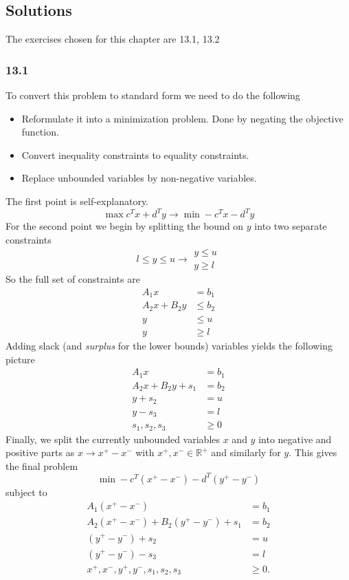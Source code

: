 \subsection{Solutions}
The exercises chosen for this chapter are 13.1, 13.2
\subsubsection{13.1}
To convert this problem to standard form we need to do the following
\begin{itemize}
    \item Reformulate it into a minimization problem. Done by negating the objective function.
    \item Convert inequality constraints to equality constraints.
    \item Replace unbounded variables by non-negative variables.
\end{itemize}
The first point is self-explanatory.
\[
    \operatorname{max} c^T x + d^T y \to \operatorname{min} -c^T x - d^T y
\]
For the second point we begin by splitting the bound on $y$ into two separate constraints
\[
    l \leq y \leq u \to \begin{array}{l}
        y \leq u \\
        y \geq l
    \end{array}
\]
So the full set of constraints are
\begin{align*}
    A_1 x         & = b_1    \\
    A_2 x + B_2 y & \leq b_2 \\
    y             & \leq u   \\
    y             & \geq l
\end{align*}
Adding slack (and \textit{surplus} for the lower bounds) variables yields the following picture
\begin{align*}
    A_1 x               & = b_1  \\
    A_2 x + B_2 y + s_1 & = b_2  \\
    y + s_2             & = u    \\
    y - s_3             & = l    \\
    s_1, s_2, s_3       & \geq 0
\end{align*}
Finally, we split the currently unbounded variables $x$ and $y$ into negative and positive parts as $x \to x^+ - x^-$ with $x^+, x^-\in \mathbb{R}^+$ and similarly for $y$.
This gives the final problem
\[
    \operatorname{min} -c^T\left(x^+ - x^-\right) - d^T\left(y^+ - y^-\right)
\]
subject to
\begin{align*}
    A_1 \left(x^+ - x^-\right)                                    & = b_1   \\
    A_2 \left(x^+ - x^-\right) + B_2 \left(y^+ - y^-\right) + s_1 & = b_2   \\
    \left(y^+ - y^-\right) + s_2                                  & = u     \\
    \left(y^+ - y^-\right) - s_3                                  & = l     \\
    x^+, x^-, y^+, y^-, s_1, s_2, s_3                             & \geq 0.
\end{align*}
